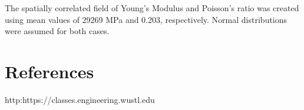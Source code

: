 \documentclass[preprint,12pt,3p]{elsarticle}
\begin{document}
The spatially correlated field of Young’s Modulus and Poisson’s ratio was created using mean values of 29269 MPa and 0.203, respectively.  Normal distributions were assumed for both cases.  

\section{References} 

\begin{thebibliography}{9}

 http:https://classes.engineering.wustl.edu

\end{thebibliography}
\end{document}
